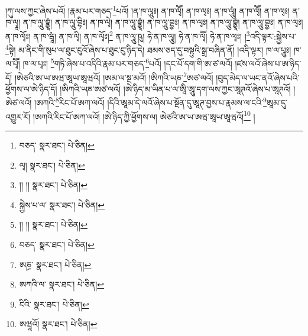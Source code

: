 །ཀུ་ལས་ཀྱང་ཞེས་པའོ། །རྣམ་པར་གཅད་\footnote{བཅད་  སྣར་ཐང་།  པེ་ཅིན། }པའོ། །ན་ཁ་ལཱུཿ། ན་ཁ་ལྭཽ། ན་ཁ་ལྭཿ། ན་ཁ་ལཱུཾ། ན་ཁ་ལྭཽ། ན་ཁ་ལྭཿ། ན་ཁ་ལྭཱ། ན་ཁ་ལཱུ་བྷྱཱཾ། ན་ཁ་ལཱུ་བྷིཿ། ན་ཁ་ལྭེ། ན་ཁ་ལཱུ་བྷྱཱཾ། ན་ཁ་ལཱུ་བྷྱཿ། ན་ཁ་ལྭཿ། ན་ཁ་ལཱུ་བྷྱཱཾ། ན་ཁ་ལཱུ་བྷྱཿ། ན་ཁ་ལྭཿ། ན་ཁ་ལྭོཿ། ན་ཁ་ཝཱཾ། ན་ཁ་ལྭི། ན་ཁ་ལྭོཿ།\footnote{ལྭ།  སྣར་ཐང་།  པེ་ཅིན། } ན་ཁ་ལཱུ་ཥུ། ཧེ་ན་ཁ་ལཱུ། ཧེ་ན་ཁ་ལྭཽ། ཧེ་ན་ཁ་ལྭཿ། །\footnote{།། །།  སྣར་ཐང་།  པེ་ཅིན། }འདི་ལྟར་:སྐྱེས་པ་\footnote{སྐྱེས་པ་ལ་  སྣར་ཐང་།  པེ་ཅིན། }སྟེ། མ་ནིང་གི་སུཔ་ལ་ཐུང་ངུའོ་ཞེས་པ་ཐུང་ངུ་ཉིད་དེ། ཐམས་ཅད་དུ་བསྟུའི་སྒྲ་བཞིན་ནོ། །འདི་ལྟར། ཁ་ལ་པཱུཿ། ཁ་ལ་པྭཽ། ཁ་ལ་པྭཿ། \footnote{།། །།   སྣར་ཐང་།  པེ་ཅིན། }གཏི་ཞེས་པ་འདིའི་རྣམ་པར་གཅད་\footnote{བཅད་  སྣར་ཐང་།  པེ་ཅིན། }པའོ། །དང་པོ་དག་གི་ཨ་ཙ་ལའོ། །ཛས་ལའོ་ཞེས་པ་ཨ་ཉིད་དོ། །ཨེཙའི་ཨ་ཡ་ཨཝ་ཨཱཡ་ཨཱཝའོ། །ཨམ་ལ་སྔ་མའོ། །ཨིཀའི་ཡཎ་\footnote{ཨཎྲ་  སྣར་ཐང་།  པེ་ཅིན། }ཨཙ་ལའོ། །བུད་མེད་ལ་ཡང་ནའོ་ཞེས་པའི་ཕྱོགས་ལ་ཨེ་ཉིད་དོ། །ཨིཀའི་ཡཎ་ཨཙ་ལའོ། །ཨེ་ཉིད་མ་ཡིན་པ་ལ་ཨཱི་ཨཱུ་དག་ལས་ཀྱང་ཨཱཊའོ་ཞེས་པ་ཨཱཊའོ། །ཨེཙ་ལའོ། །ཨཀའི་\footnote{ཨཀའི་ལ་  སྣར་ཐང་།  པེ་ཅིན། }རིང་པོ་ཨཀ་ལའོ། །དིའི་ཨཱམ་དེ་ལའོ་ཞེས་པ་སྔོན་དུ་ཨཱཊ་བྱས་པ་རྣམས་ལ་ངའི་\footnote{ངིའི་  སྣར་ཐང་།  པེ་ཅིན། }ཨཱམ་དུ་འགྱུར་རོ། །ཨཀའི་རིང་པོ་ཨཀ་ལའོ། །ཨེ་ཉིད་ཀྱི་ཕྱོགས་ལ། ཨེཙའི་ཨ་ཡ་ཨཝ་ཨཱཡ་ཨཱཝའོ།\footnote{ཨཝཱའོ།  སྣར་ཐང་།  པེ་ཅིན། } །
